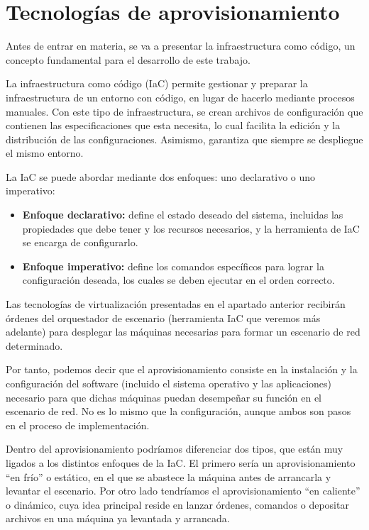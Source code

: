 \section{Tecnologías de aprovisionamiento} \label{sec:aprov}
	Antes de entrar en materia, se va a presentar la infraestructura como código, un concepto fundamental para el desarrollo de este trabajo. 

	La infraestructura como código (IaC) permite gestionar y preparar la infraestructura de un entorno con código, en lugar de hacerlo mediante procesos manuales. Con este tipo de infraestructura, se crean archivos de configuración que contienen las especificaciones que esta necesita, lo cual facilita la edición y la distribución de las configuraciones. Asimismo, garantiza que siempre se despliegue el mismo entorno.~\cite{aprov1}

	La IaC se puede abordar mediante dos enfoques: uno declarativo o uno imperativo:

	\begin{itemize}
		\item \textbf{Enfoque declarativo:} define el estado deseado del sistema, incluidas las propiedades que debe tener y los recursos necesarios, y la herramienta de IaC se encarga de configurarlo.
		\item \textbf{Enfoque imperativo:} define los comandos específicos para lograr la configuración deseada, los cuales se deben ejecutar en el orden correcto.
	\end{itemize}

	Las tecnologías de virtualización presentadas en el apartado anterior recibirán órdenes del orquestador de escenario (herramienta IaC que veremos más adelante) para desplegar las máquinas necesarias para formar un escenario de red determinado. 

	Por tanto, podemos decir que el aprovisionamiento consiste en la instalación y la configuración del software (incluido el sistema operativo y las aplicaciones) necesario para que dichas máquinas puedan desempeñar su función en el escenario de red. No es lo mismo que la configuración, aunque ambos son pasos en el proceso de implementación.

	Dentro del aprovisionamiento podríamos diferenciar dos tipos, que están muy ligados a los distintos enfoques de la IaC. El primero sería un aprovisionamiento “en frío” o estático, en el que se abastece la máquina antes de arrancarla y levantar el escenario. Por otro lado tendríamos el aprovisionamiento “en caliente” o dinámico, cuya idea principal reside en  lanzar órdenes, comandos o depositar archivos en una máquina ya levantada y arrancada.

